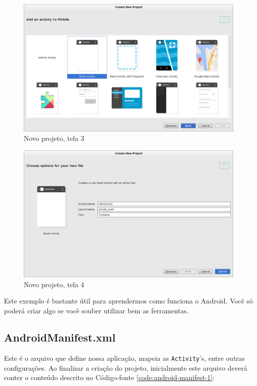 \begin{figure}[p]
    \includegraphics[scale=0.35]{img/exemplo-pratico/android-new-project-3.png}
    \caption{Novo projeto, tela 3}
    \label{fig:new-project-3}
\end{figure}

\begin{figure}[h]
    \includegraphics[scale=0.35]{img/exemplo-pratico/android-new-project-4.png}
    \caption{Novo projeto, tela 4}
    \label{fig:new-project-4}
\end{figure}

Este exemplo é bastante útil para aprendermos como funciona o Android.
Você só poderá criar algo se você souber utilizar bem as ferramentas.

\subsection{AndroidManifest.xml}

Este é o arquivo que define nossa aplicação, mapeia as
\texttt{Activity}'s, entre outras configurações. Ao finalizar a criação
do projeto, inicialmente este arquivo deverá conter o conteúdo descrito
no Código-fonte \ref{code:android-manifest-1}:

